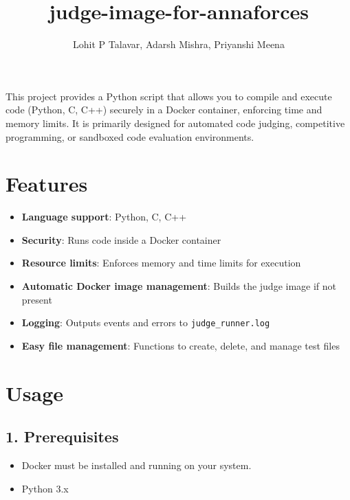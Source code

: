 \documentclass{article}
\begin{document}
\title{judge-image-for-annaforces}
\author{Lohit P Talavar, Adarsh Mishra, Priyanshi Meena}
\date{}
\maketitle

This project provides a Python script that allows you to compile and execute code (Python, C, C++) securely in a Docker container, enforcing time and memory limits. It is primarily designed for automated code judging, competitive programming, or sandboxed code evaluation environments.

\section*{Features}
\begin{itemize}
    \item \textbf{Language support}: Python, C, C++
    \item \textbf{Security}: Runs code inside a Docker container
    \item \textbf{Resource limits}: Enforces memory and time limits for execution
    \item \textbf{Automatic Docker image management}: Builds the judge image if not present
    \item \textbf{Logging}: Outputs events and errors to \texttt{judge\_runner.log}
    \item \textbf{Easy file management}: Functions to create, delete, and manage test files
\end{itemize}

\section*{Usage}

\subsection*{1. Prerequisites}
\begin{itemize}
    \item Docker must be installed and running on your system.
    \item Python 3.x
\end{itemize}

\newpage
\end{document}
